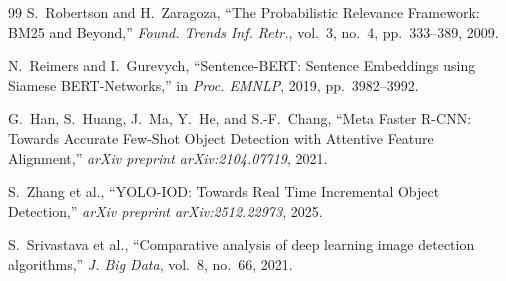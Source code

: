 \documentclass[conference]{IEEEtran}
\begin{document}
\begin{thebibliography}{99}
S.~Robertson and H.~Zaragoza, ``The Probabilistic Relevance Framework:
BM25 and Beyond,'' \textit{Found. Trends Inf. Retr.}, vol.~3, no.~4,
pp.~333--389, 2009.

N.~Reimers and I.~Gurevych, ``Sentence-BERT: Sentence Embeddings using
Siamese BERT-Networks,'' in \textit{Proc. EMNLP}, 2019, pp.~3982--3992.

G.~Han, S.~Huang, J.~Ma, Y.~He, and S.-F.~Chang, ``Meta Faster R-CNN:
Towards Accurate Few-Shot Object Detection with Attentive Feature
Alignment,'' \textit{arXiv preprint arXiv:2104.07719}, 2021.

S.~Zhang et al., ``YOLO-IOD: Towards Real Time Incremental Object
Detection,'' \textit{arXiv preprint arXiv:2512.22973}, 2025.

S.~Srivastava et al., ``Comparative analysis of deep learning image
detection algorithms,'' \textit{J. Big Data}, vol.~8, no.~66, 2021.

\end{thebibliography}
\end{document}
